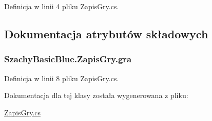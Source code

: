 Definicja w linii 4 pliku Zapis\-Gry.\-cs.



\subsection{Dokumentacja atrybutów składowych}
\hypertarget{class_szachy_basic_blue_1_1_zapis_gry_ad5132df82a910fdf245750c99b031746}{
\subsubsection[{gra}]{ Szachy\-Basic\-Blue.\-Zapis\-Gry.\-gra\hspace{0.3cm}{\ttfamily [private]}}}\label{class_szachy_basic_blue_1_1_zapis_gry_ad5132df82a910fdf245750c99b031746}


Definicja w linii 8 pliku Zapis\-Gry.\-cs.



Dokumentacja dla tej klasy została wygenerowana z pliku\-:\begin{DoxyCompactItemize}
\item 
\hyperlink{_zapis_gry_8cs}{Zapis\-Gry.\-cs}\end{DoxyCompactItemize}
